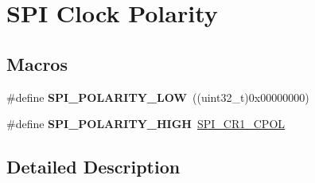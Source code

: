 \hypertarget{group___s_p_i___clock___polarity}{}\section{S\+PI Clock Polarity}
\label{group___s_p_i___clock___polarity}
\subsection*{Macros}
\begin{DoxyCompactItemize}
\item 
\#define {\bfseries S\+P\+I\+\_\+\+P\+O\+L\+A\+R\+I\+T\+Y\+\_\+\+L\+OW}~((uint32\+\_\+t)0x00000000)\hypertarget{group___s_p_i___clock___polarity_gaf61e3c6ec671baef099516265793c8df}{}\label{group___s_p_i___clock___polarity_gaf61e3c6ec671baef099516265793c8df}

\item 
\#define {\bfseries S\+P\+I\+\_\+\+P\+O\+L\+A\+R\+I\+T\+Y\+\_\+\+H\+I\+GH}~\hyperlink{group___peripheral___registers___bits___definition_ga2616a10f5118cdc68fbdf0582481e124}{S\+P\+I\+\_\+\+C\+R1\+\_\+\+C\+P\+OL}\hypertarget{group___s_p_i___clock___polarity_ga6910e2527b7511eb3a55946b9b775cff}{}\label{group___s_p_i___clock___polarity_ga6910e2527b7511eb3a55946b9b775cff}

\end{DoxyCompactItemize}


\subsection{Detailed Description}
